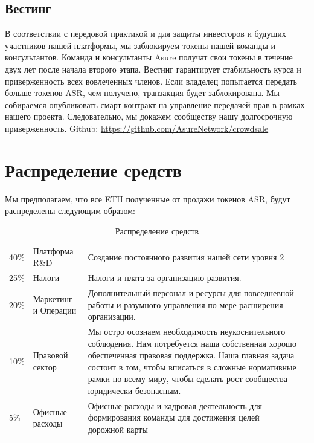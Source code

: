 \subsection{Вестинг}
В соответствии с передовой практикой и для защиты инвесторов и будущих участников нашей платформы, мы заблокируем токены нашей команды и консультантов. Команда и консультанты Asure получат свои токены в течение двух лет после начала второго этапа.
Вестинг гарантирует стабильность курса и приверженность всех вовлеченных членов. Если владелец попытается передать больше токенов ASR, чем получено, транзакция будет заблокирована.
Мы собираемся опубликовать смарт контракт на управление передачей прав в рамках нашего проекта. Следовательно, мы докажем сообществу нашу долгосрочную приверженность.
\newline\newline
Github: \url{https://github.com/AsureNetwork/crowdsale}

\newpage \section{Распределение средств}

Мы предполагаем, что все ETH полученные от продажи токенов ASR, будут распределены следующим образом:
\newline\newline

\begin{table}[H]
\begin{tabular}{llp{}l}
  40\% & Платформа R\&D & Создание постоянного развития нашей сети уровня 2 \\
  25\% & Налоги & Налоги и плата за организацию развития.\\
  20\% & Маркетинг и Операции & Дополнительный персонал и ресурсы для повседневной работы и разумного управления по мере расширения организации. \\
  10\% & Правовой сектор & Мы остро осознаем необходимость неукоснительного соблюдения. Нам потребуется наша собственная хорошо обеспеченная правовая поддержка. Наша главная задача состоит в том, чтобы вписаться в сложные нормативные рамки по всему миру, чтобы сделать рост сообщества юридически безопасным. \\

  5\% & Офисные расходы & Офисные расходы и кадровая деятельность для формирования команды для достижения целей дорожной карты
\end{tabular}
\caption{\label{tab:table-name}Распределение средств}
\end{table}

